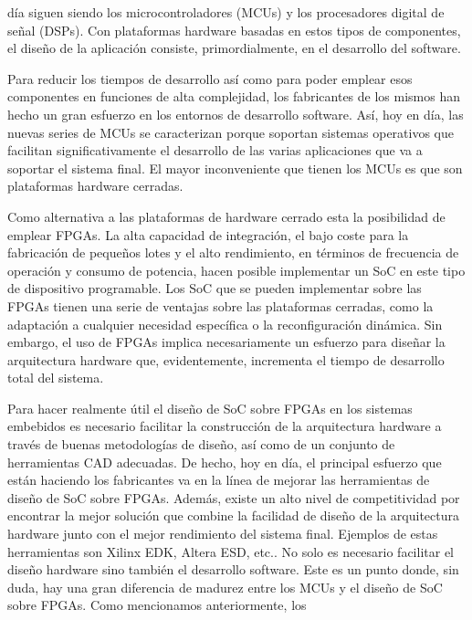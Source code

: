 día siguen siendo los microcontroladores (MCUs) y los procesadores digital de señal (DSPs). Con plataformas hardware basadas en  estos tipos de
componentes, el diseño de la aplicación consiste, primordialmente, en el desarrollo del software.
\vspace{0.5cm}
\par 
Para reducir los tiempos de desarrollo así como para poder emplear esos componentes en funciones de alta complejidad, los fabricantes de los mismos
han hecho un gran esfuerzo en los entornos de desarrollo software. Así, hoy en día, las nuevas series de MCUs se caracterizan porque soportan
sistemas operativos que facilitan significativamente el desarrollo de las varias aplicaciones que va a soportar el sistema final. El mayor
inconveniente que tienen los MCUs es que son plataformas hardware cerradas.
\vspace{0.5cm}
\par 
Como alternativa a las plataformas de hardware cerrado esta la posibilidad de emplear FPGAs. La alta capacidad de integración, el bajo
coste para la fabricación de pequeños lotes y el alto rendimiento, en términos de frecuencia de operación y consumo de potencia, hacen posible
implementar un SoC en este tipo de dispositivo programable. Los SoC que se pueden implementar sobre las FPGAs tienen una serie de ventajas sobre las
plataformas cerradas, como la adaptación a cualquier necesidad específica o la reconfiguración dinámica. Sin embargo, el uso de FPGAs implica
necesariamente un esfuerzo para diseñar la arquitectura hardware que, evidentemente, incrementa el tiempo de desarrollo total del sistema.
\vspace{0.5cm}
\par 
Para hacer realmente útil el diseño de SoC sobre FPGAs en los sistemas embebidos es necesario facilitar la construcción de la arquitectura hardware a
través de buenas metodologías de diseño, así como de un conjunto de herramientas CAD adecuadas. De hecho, hoy en día, el principal esfuerzo que están
haciendo los fabricantes va en la línea de mejorar las herramientas de diseño de SoC sobre FPGAs. Además, existe un alto nivel de competitividad por
encontrar la mejor solución que combine la facilidad de diseño de la arquitectura hardware junto con el mejor rendimiento del sistema final. Ejemplos
de estas herramientas son Xilinx EDK, Altera ESD, etc.. No solo es necesario facilitar el diseño hardware sino también el desarrollo software. Este
es un punto donde, sin duda, hay una gran diferencia de madurez entre los MCUs y el diseño de SoC sobre FPGAs. Como mencionamos anteriormente, los
